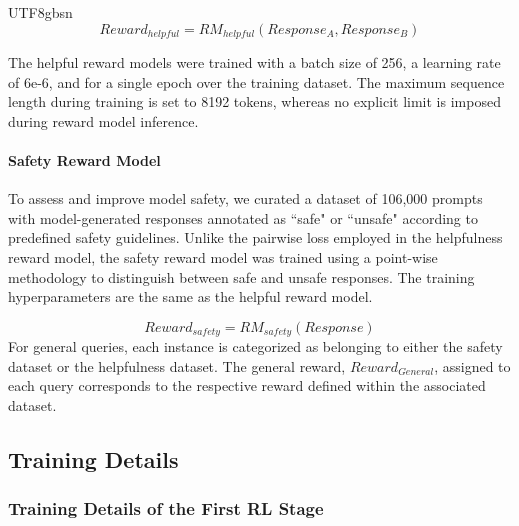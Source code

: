 \documentclass[11pt, a4paper, logo, copyright, nonumbering]{deepseek}
\begin{document}
\begin{CJK*}{UTF8}{gbsn}
\begin{equation} 
    Reward_{helpful} = RM_{helpful}(Response_A, Response_B)
\end{equation}

The helpful reward models were trained with a batch size of 256, a learning rate of 6e-6, and for a single epoch over the training dataset. The maximum sequence length during training is set to 8192 tokens, whereas no explicit limit is imposed during reward model inference. 



\paragraph{Safety Reward Model}
To assess and improve model safety, we curated a dataset of 106,000 prompts with model-generated responses annotated as ``safe" or ``unsafe" according to predefined safety guidelines. Unlike the pairwise loss employed in the helpfulness reward model, the safety reward model was trained using a point-wise methodology to distinguish between safe and unsafe responses. The training hyperparameters are the same as the helpful reward model. 

\begin{equation}
    Reward_{safety} = RM_{safety}(Response)
\end{equation}
For general queries, each instance is categorized as belonging to either the safety dataset or the helpfulness dataset. The general reward, $Reward_{General}$, assigned to each query corresponds to the respective reward defined within the associated dataset. 


\subsection{Training Details}

\label{sec:rl-detail}
\subsubsection{Training Details of the First RL Stage} \label{sec: r1-1-rl}


\end{CJK*}
\end{document}
